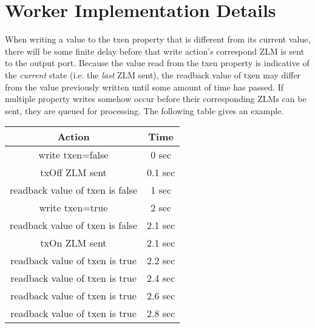 \documentclass{article}
\begin{document}
\section*{Worker Implementation Details}
\begin{flushleft}
When writing a value to the txen property that is different from its
       current value, there will be some finite delay before that write action's
       correspond ZLM is sent to the output port. Because the value read from
       the txen property is indicative of the \textit{current} state (i.e. the \textit{last}
       ZLM sent), the readback value of txen may differ from the value
       previously written until some amount of time has passed. If multiple
       property writes somehow occur before their corresponding ZLMs can be
       sent, they are queued for processing. The following table
       gives an example.

  \begin{center}
	\begin{tabular}{|c|c|}
		\hline
		\rowcolor{blue}
		Action & Time \\
		\hline
      write txen=false                & 0    sec \\
      txOff ZLM sent                  & 0.1  sec \\
      readback value of txen is false & 1    sec \\
      write txen=true                 & 2    sec \\
      readback value of txen is false & 2.1  sec \\
      txOn ZLM sent                   & 2.1  sec \\
      readback value of txen is true  & 2.2  sec \\
      readback value of txen is true  & 2.4  sec \\
      readback value of txen is true  & 2.6  sec \\
      readback value of txen is true  & 2.8  sec \\
		\hline
	\end{tabular}
  \end{center}

\end{flushleft}
\end{document}

